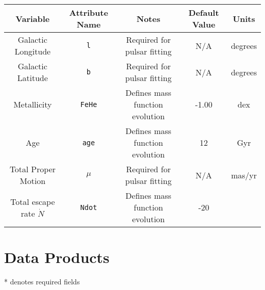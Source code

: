 \documentclass[12pt]{article}
\begin{document}
\begin{center}
\begin{table}[H]
\begin{tabular}{ | c | c | c | c | c | }
    \hline
    Variable & Attribute Name & Notes & Default Value & Units \\
    \hline\hline
    Galactic Longitude & \texttt{l} &
    Required for pulsar fitting & N/A & degrees \\
    \hline
    Galactic Latitude & \texttt{b}  &
    Required for pulsar fitting & N/A & degrees \\
    \hline
    Metallicity & \texttt{FeHe} &
    Defines mass function evolution & -1.00 & dex \\
    \hline
    Age & \texttt{age} & Defines mass function evolution & 12 & Gyr \\
    \hline
    Total Proper Motion & \texttt{\(\mu\)} &
    Required for pulsar fitting & N/A & mas/yr \\
    \hline
    Total escape rate \(\dot{N}\) & \texttt{Ndot} &
    Defines mass function evolution & -20 & \\
    \hline
\end{tabular}
\end{table}
\end{center}



\section{Data Products}

* denotes required fields










\end{document}
